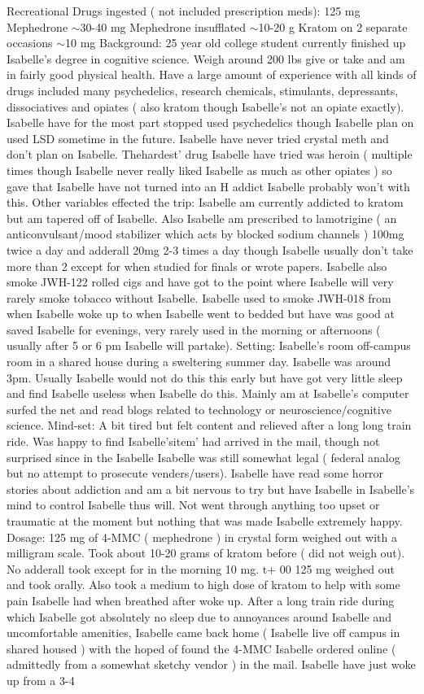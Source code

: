 \documentclass[12pt]{book}
\begin{document}
Recreational Drugs ingested ( not included prescription meds): 125 mg Mephedrone $\sim$30-40 mg Mephedrone insufflated $\sim$10-20 g Kratom on 2 separate occasions $\sim$10 mg Background: 25 year old college student currently finished up Isabelle's degree in cognitive science. Weigh around 200 lbs give or take and am in fairly good physical health. Have a large amount of experience with all kinds of drugs included many psychedelics, research chemicals, stimulants, depressants, dissociatives and opiates ( also kratom though Isabelle's not an opiate exactly). Isabelle have for the most part stopped used psychedelics though Isabelle plan on used LSD sometime in the future. Isabelle have never tried crystal meth and don't plan on Isabelle. Thehardest' drug Isabelle have tried was heroin ( multiple times though Isabelle never really liked Isabelle as much as other opiates ) so gave that Isabelle have not turned into an H addict Isabelle probably won't with this. Other variables effected the trip: Isabelle am currently addicted to kratom but am tapered off of Isabelle. Also Isabelle am prescribed to lamotrigine ( an anticonvulsant/mood stabilizer which acts by blocked sodium channels ) 100mg twice a day and adderall 20mg 2-3 times a day though Isabelle usually don't take more than 2 except for when studied for finals or wrote papers. Isabelle also smoke JWH-122 rolled cigs and have got to the point where Isabelle will very rarely smoke tobacco without Isabelle. Isabelle used to smoke JWH-018 from when Isabelle woke up to when Isabelle went to bedded but have was good at saved Isabelle for evenings, very rarely used in the morning or afternoons ( usually after 5 or 6 pm Isabelle will partake). Setting: Isabelle's room off-campus room in a shared house during a sweltering summer day. Isabelle was around 3pm. Usually Isabelle would not do this this early but have got very little sleep and find Isabelle useless when Isabelle do this. Mainly am at Isabelle's computer surfed the net and read blogs related to technology or neuroscience/cognitive science. Mind-set: A bit tired but felt content and relieved after a long long train ride. Was happy to find Isabelle'sitem' had arrived in the mail, though not surprised since in the Isabelle Isabelle was still somewhat legal ( federal analog but no attempt to prosecute venders/users). Isabelle have read some horror stories about addiction and am a bit nervous to try but have Isabelle in Isabelle's mind to control Isabelle thus will. Not went through anything too upset or traumatic at the moment but nothing that was made Isabelle extremely happy. Dosage: 125 mg of 4-MMC ( mephedrone ) in crystal form weighed out with a milligram scale. Took about 10-20 grams of kratom before ( did not weigh out). No adderall took except for in the morning 10 mg. t+ 00 125 mg weighed out and took orally. Also took a medium to high dose of kratom to help with some pain Isabelle had when breathed after woke up. After a long train ride during which Isabelle got absolutely no sleep due to annoyances around Isabelle and uncomfortable amenities, Isabelle came back home ( Isabelle live off campus in shared housed ) with the hoped of found the 4-MMC Isabelle ordered online ( admittedly from a somewhat sketchy vendor ) in the mail. Isabelle have just woke up from a 3-4 
\end{document}
